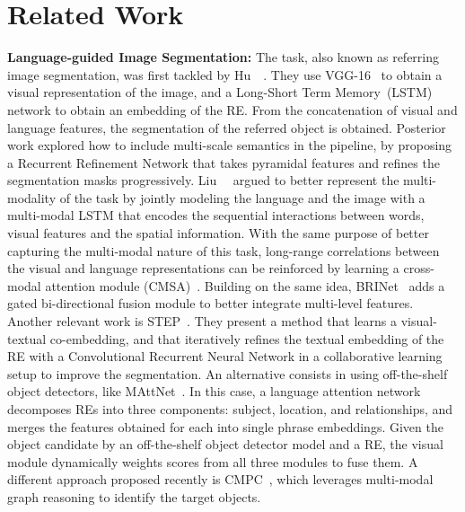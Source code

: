 \documentclass[10pt,twocolumn,letterpaper]{article}
\begin{document}
 \section{Related Work}
\label{sec:related}




























\noindent
\textbf{Language-guided Image Segmentation:} The task, also known as referring image segmentation, was first tackled by Hu~\etal~\cite{hu2016segmentation}. They use VGG-16~\cite{simonyan2014very} to obtain a visual representation of the image, and a Long-Short Term Memory~(LSTM) network to obtain an embedding of the RE. From the concatenation of visual and language features, the segmentation of the referred object is obtained. Posterior work \cite{liu2017recurrent} explored how to include multi-scale semantics in the pipeline, by proposing a Recurrent Refinement Network that takes pyramidal features and refines the segmentation masks progressively. Liu~\etal~\cite{liu2019learning} argued to better represent the multi-modality of the task by jointly modeling the language and the image with a multi-modal LSTM that encodes the sequential interactions between words, visual features and the spatial information. With the same purpose of better capturing the multi-modal nature of this task, long-range correlations between the visual and language representations can be reinforced by learning a cross-modal attention module (CMSA)~\cite{ye2019cross}. Building on the same idea, BRINet~\cite{hu2020bi} adds a gated bi-directional fusion module to better integrate multi-level features. Another relevant work is STEP~\cite{chen2019see}. They present a method that learns a visual-textual co-embedding, and that iteratively refines the textual embedding of the RE with a Convolutional Recurrent Neural Network in a collaborative learning setup to improve the segmentation.
An alternative consists in using off-the-shelf object detectors, like MAttNet~\cite{yu2018mattnet}. In this case, a language attention network decomposes REs into three components: subject, location, and relationships, and merges the features obtained for each into single phrase embeddings. Given the object candidate by an off-the-shelf object detector model and a RE, the visual module dynamically weights scores from all three modules to fuse them. A different approach proposed recently is CMPC~\cite{huang2020referring}, which leverages multi-modal graph reasoning to identify the target objects.
\end{document}
